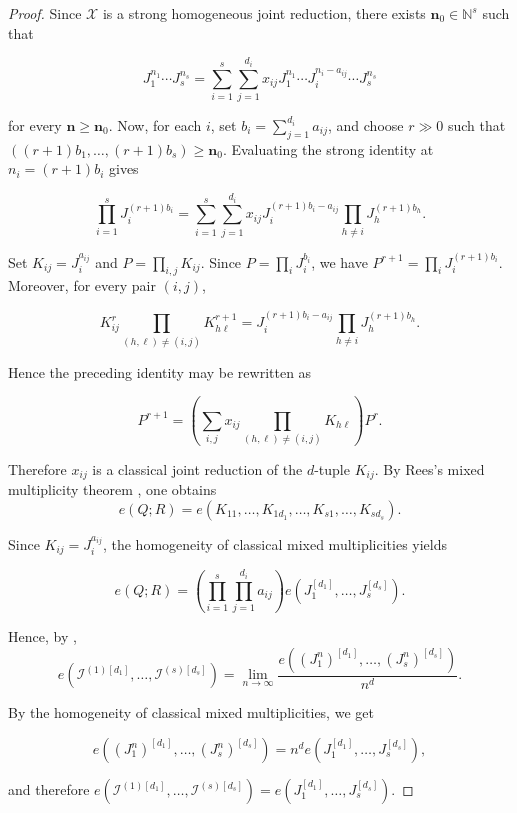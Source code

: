 \documentclass[reqno,12pt]{amsart}
\theoremstyle{plain}
\theoremstyle{definition}
\theoremstyle{remark}
\numberwithin{equation}{section}
\begin{document}
\begin{proof}
Since $\mathcal X$ is a strong homogeneous joint reduction, there exists
$\mathbf n_0\in\mathbb N^s$ such that

$$
J_1^{n_1}\cdots J_s^{n_s}
=
\sum_{i=1}^{s}\sum_{j=1}^{d_i}
x_{ij}
J_1^{n_1}\cdots J_i^{n_i-a_{ij}}\cdots J_s^{n_s}
$$

for every $\mathbf n\geq\mathbf n_0$. Now, for each $i$, set $b_i=\sum_{j=1}^{d_i}a_{ij}$, and choose $r\gg0$ such
that $((r+1)b_1,\ldots,(r+1)b_s)\geq\mathbf n_0$. Evaluating the strong
identity at $n_i=(r+1)b_i$ gives

$$
\prod_{i=1}^{s}J_i^{(r+1)b_i}
=
\sum_{i=1}^{s}\sum_{j=1}^{d_i}
x_{ij}
J_i^{(r+1)b_i-a_{ij}}
\prod_{h\neq i}J_h^{(r+1)b_h}.
$$

Set $K_{ij}=J_i^{a_{ij}}$ and $P=\prod_{i,j}K_{ij}$. Since
$P=\prod_iJ_i^{b_i}$, we have
$P^{r+1}=\prod_iJ_i^{(r+1)b_i}$. Moreover, for every pair $(i,j)$,

$$
K_{ij}^{r}
\prod_{(h,\ell)\neq(i,j)}K_{h\ell}^{r+1}
=
J_i^{(r+1)b_i-a_{ij}}
\prod_{h\neq i}J_h^{(r+1)b_h}.
$$

Hence the preceding identity may be rewritten as

$$
P^{r+1}
=
\left(
\sum_{i,j}
x_{ij}\prod_{(h,\ell)\neq(i,j)}K_{h\ell}
\right)P^r.
$$

Therefore ${x_{ij}}$ is a classical joint reduction of the $d$-tuple
${K_{ij}}$. By Rees's mixed multiplicity theorem
\cite[Theorem~17.4.9]{SwansonHuneke}, one obtains
$$
e(Q;R)
=
e\!\left(
K_{11},\ldots,K_{1d_1},
\ldots,
K_{s1},\ldots,K_{sd_s}
\right).
$$

Since $K_{ij}=J_i^{a_{ij}}$, the homogeneity of classical mixed
multiplicities
\cite[Theorem~17.4.2 and Definition~17.4.3]{SwansonHuneke} yields

$$
e(Q;R)
=
\left(\prod_{i=1}^{s}\prod_{j=1}^{d_i}a_{ij}\right)
e\!\left(J_1^{[d_1]},\ldots,J_s^{[d_s]}\right).
$$

Hence, by \cite[Equation~(9)]{Cutkosky2026},
$$
e\!\left(
\mathcal I^{(1)[d_1]},\ldots,\mathcal I^{(s)[d_s]}
\right)
=
\lim_{n\to\infty}
\frac{
e((J_1^n)^{[d_1]},\ldots,(J_s^n)^{[d_s]})
}{n^d}.
$$

By the homogeneity of classical mixed multiplicities, we get

$$
e((J_1^n)^{[d_1]},\ldots,(J_s^n)^{[d_s]})
=
n^d e(J_1^{[d_1]},\ldots,J_s^{[d_s]}),
$$

and therefore
$e\!\left(
\mathcal I^{(1)[d_1]},\ldots,\mathcal I^{(s)[d_s]}
\right)
=
e(J_1^{[d_1]},\ldots,J_s^{[d_s]}).
$
\end{proof}
\end{document}
